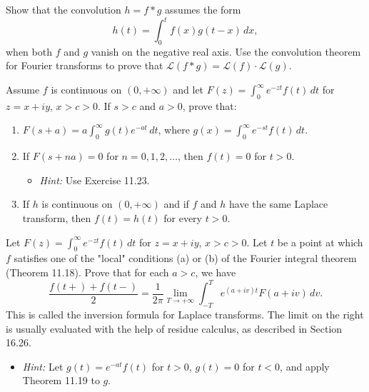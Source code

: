 \begin{problembox}
Show that the convolution $h = f * g$ assumes the form
\[
h(t) = \int_0^t f(x) g(t - x) \, dx,
\]
when both $f$ and $g$ vanish on the negative real axis. Use the convolution theorem for Fourier transforms to prove that $\mathcal{L}(f * g) = \mathcal{L}(f) \cdot \mathcal{L}(g)$.
\end{problembox}

\begin{problembox}
Assume $f$ is continuous on $(0, +\infty)$ and let $F(z) = \int_0^\infty e^{-zt} f(t) \, dt$ for $z = x + iy$, $x > c > 0$. If $s > c$ and $a > 0$, prove that:
\begin{enumerate}[label=(\alph*)]
\item $F(s + a) = a \int_0^\infty g(t) e^{-at} \, dt$, where $g(x) = \int_0^\infty e^{-st} f(t) \, dt$.
\item If $F(s + na) = 0$ for $n = 0, 1, 2, \dots$, then $f(t) = 0$ for $t > 0$.
\begin{itemize}
\item \textit{Hint:} Use Exercise 11.23.
\end{itemize}
\item If $h$ is continuous on $(0, +\infty)$ and if $f$ and $h$ have the same Laplace transform, then $f(t) = h(t)$ for every $t > 0$.
\end{enumerate}
\end{problembox}

\begin{problembox}
Let $F(z) = \int_0^\infty e^{-zt} f(t) \, dt$ for $z = x + iy$, $x > c > 0$. Let $t$ be a point at which $f$ satisfies one of the "local" conditions (a) or (b) of the Fourier integral theorem (Theorem 11.18). Prove that for each $a > c$, we have
\[
\frac{f(t+) + f(t-)}{2} = \frac{1}{2\pi} \lim_{T \to +\infty} \int_{-T}^T e^{(a + iv)t} F(a + iv) \, dv.
\]
This is called the inversion formula for Laplace transforms. The limit on the right is usually evaluated with the help of residue calculus, as described in Section 16.26.
\begin{itemize}
\item \textit{Hint:} Let $g(t) = e^{-at} f(t)$ for $t > 0$, $g(t) = 0$ for $t < 0$, and apply Theorem 11.19 to $g$.
\end{itemize}
\end{problembox}


